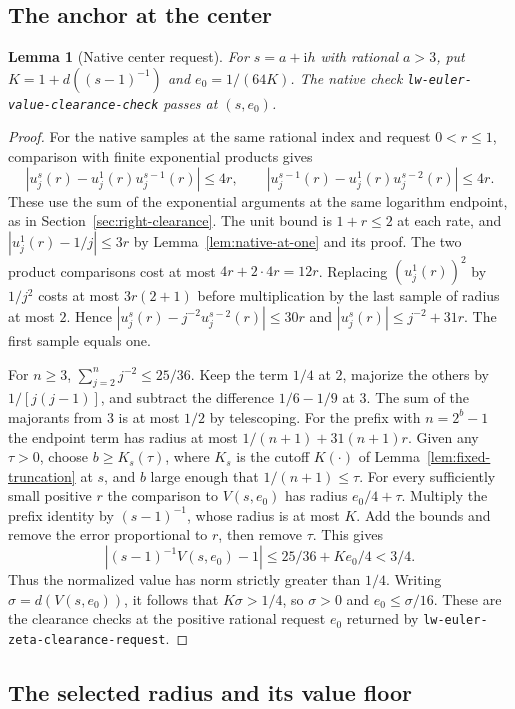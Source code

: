 \documentclass[11pt]{amsart}
\newtheorem{lemma}[theorem]{Lemma}
\theoremstyle{definition}
\theoremstyle{remark}
\numberwithin{equation}{section}
\newcommand{\code}[1]{\nolinkurl{#1}}
\begin{document}
\subsection{The anchor at the center}

\begin{lemma}[Native center request]\label{lem:circle-center-anchor}
For $s=a+\mathrm i h$ with rational $a>3$, put
$K=1+d((s-1)^{-1})$ and $e_0=1/(64K)$.
The native check \code{lw-euler-value-clearance-check} passes
at $(s,e_0)$.
\end{lemma}
\begin{proof}
For the native samples at the same rational index and request
$0<r\le1$, comparison with finite exponential products gives
\[
 |u_j^s(r)-u_j^1(r)u_j^{s-1}(r)|\le4r,\qquad
 |u_j^{s-1}(r)-u_j^1(r)u_j^{s-2}(r)|\le4r.
\]
These use the sum of the exponential arguments at the same
logarithm endpoint, as in Section~\ref{sec:right-clearance}.
The unit bound is $1+r\le2$ at each rate, and
$|u_j^1(r)-1/j|\le3r$ by Lemma~\ref{lem:native-at-one}
and its proof. The two product comparisons cost at most
$4r+2\cdot4r=12r$. Replacing $(u_j^1(r))^2$ by $1/j^2$
costs at most $3r(2+1)$ before multiplication by the last
sample of radius at most $2$. Hence
$|u_j^s(r)-j^{-2}u_j^{s-2}(r)|\le30r$ and
$|u_j^s(r)|\le j^{-2}+31r$. The first sample equals one.

For $n\ge3$, $\sum_{j=2}^n j^{-2}\le25/36$. Keep the
term $1/4$ at $2$, majorize the others by $1/[j(j-1)]$,
and subtract the difference $1/6-1/9$ at $3$.
The sum of the majorants from $3$ is at most $1/2$ by
telescoping. For the prefix with $n=2^b-1$ the endpoint
term has radius at most $1/(n+1)+31(n+1)r$.
Given any $\tau>0$, choose $b\ge K_s(\tau)$, where
$K_s$ is the cutoff $K(\cdot)$ of
Lemma~\ref{lem:fixed-truncation} at $s$, and $b$ large
enough that $1/(n+1)\le\tau$. For every sufficiently
small positive $r$ the comparison to $V(s,e_0)$ has radius
$e_0/4+\tau$. Multiply the prefix identity by $(s-1)^{-1}$,
whose radius is at most $K$. Add the bounds and remove the
error proportional to $r$, then remove $\tau$. This gives
\[
 |(s-1)^{-1}V(s,e_0)-1|\le25/36+K e_0/4<3/4 .
\]
Thus the normalized value has norm strictly greater than
$1/4$. Writing $\sigma=d(V(s,e_0))$, it follows that
$K\sigma>1/4$, so $\sigma>0$ and $e_0\le\sigma/16$.
These are the clearance checks at the positive rational request
$e_0$ returned by \code{lw-euler-zeta-clearance-request}.
\end{proof}

\subsection{The selected radius and its value floor}
\end{document}

